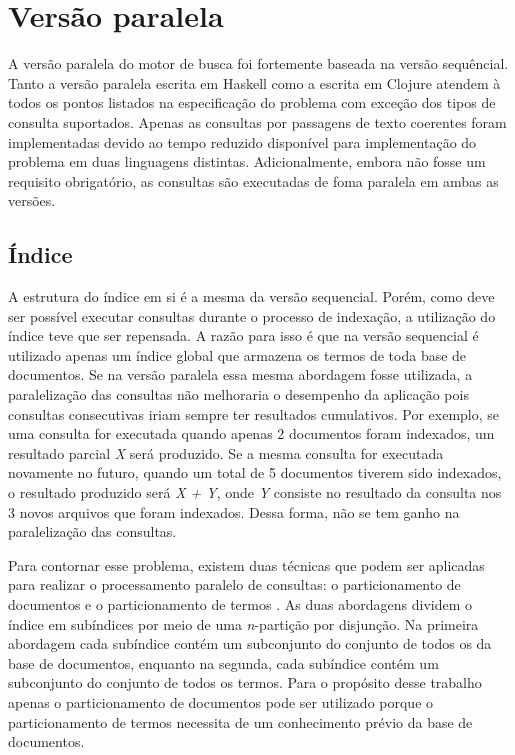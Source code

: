\section{Versão paralela}

A versão paralela do motor de busca foi fortemente baseada na versão sequêncial. Tanto a versão paralela escrita em Haskell como a escrita em Clojure atendem à todos os pontos listados na especificação do problema com exceção dos tipos de consulta suportados. Apenas as consultas por passagens de texto coerentes foram implementadas devido ao tempo reduzido disponível para implementação do problema em duas linguagens distintas. Adicionalmente, embora não fosse um requisito obrigatório, as consultas são executadas de foma paralela em ambas as versões.

\subsection{Índice}

A estrutura do índice em si é a mesma da versão sequencial. Porém, como deve ser possível executar consultas durante o processo de indexação, a utilização do índice teve que ser repensada. A razão para isso é que na versão sequencial é utilizado apenas um índice global que armazena os termos de toda base de documentos. Se na versão paralela essa mesma abordagem fosse utilizada, a paralelização das consultas não melhoraria o desempenho da aplicação pois consultas consecutivas iriam sempre ter resultados cumulativos. Por exemplo, se uma consulta for executada quando apenas 2 documentos foram indexados, um resultado parcial \emph{X} será produzido. Se a mesma consulta for executada novamente no futuro, quando um total de 5 documentos tiverem sido indexados, o resultado produzido será \emph{X + Y}, onde \emph{Y} consiste no resultado da consulta nos 3 novos arquivos que foram indexados. Dessa forma, não se tem ganho na paralelização das consultas.

Para contornar esse problema, existem duas técnicas que podem ser aplicadas para realizar o processamento paralelo de consultas: o particionamento de documentos e o particionamento de termos \cite{buttcher2010information}. As duas abordagens dividem o índice em subíndices por meio de uma \emph{n}-partição por disjunção. Na primeira abordagem cada subíndice contém um subconjunto do conjunto de todos os da base de documentos, enquanto na segunda, cada subíndice contém um subconjunto do conjunto de todos os termos. Para o propósito desse trabalho apenas o particionamento de documentos pode ser utilizado porque o particionamento de termos necessita de um conhecimento prévio da base de documentos.

